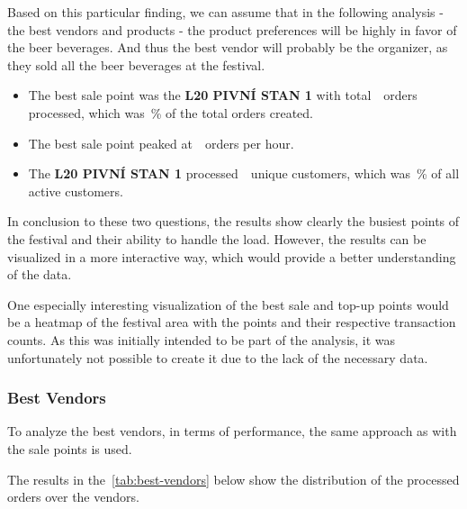 Based on this particular finding, we can assume that in the following analysis - the best vendors and products - the product preferences will be highly in favor of the beer beverages.
And thus the best vendor will probably be the organizer, as they sold all the beer beverages at the festival.

\begin{keytakeaways}
	\begin{itemize}
		\item The best sale point was the \textbf{L20 PIVNÍ STAN 1} with total~~orders processed, which was~\% of the total orders created.
		\item The best sale point peaked at~~orders per hour.
		\item The \textbf{L20 PIVNÍ STAN 1} processed~~unique customers, which was~\% of all active customers.
	\end{itemize}
\end{keytakeaways}

In conclusion to these two questions, the results show clearly the busiest points of the festival and their ability to handle the load.
However, the results can be visualized in a more interactive way, which would provide a better understanding of the data.

One especially interesting visualization of the best sale and top-up points would be a heatmap of the festival area with the points and their respective transaction counts.
As this was initially intended to be part of the analysis, it was unfortunately not possible to create it due to the lack of the necessary data.


\subsubsection{Best Vendors}
\label{subsubsec:analysis-best-vendors}

To analyze the best vendors, in terms of performance, the same approach as with the sale points is used.


The results in the~\autoref{tab:best-vendors} below show the distribution of the processed orders over the vendors.

